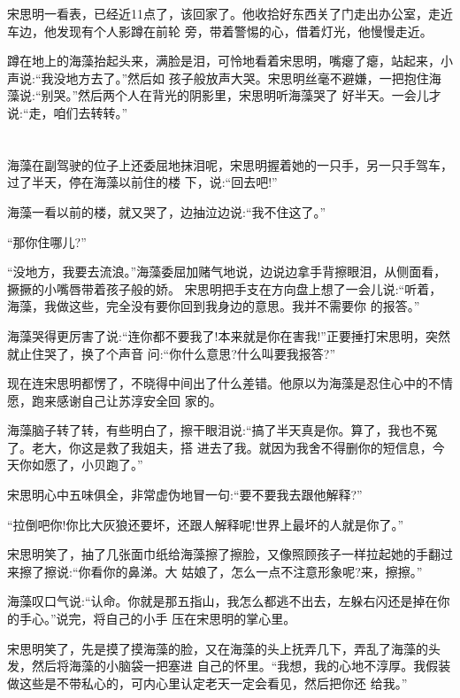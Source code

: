 \documentclass[11pt,a4paper,onecolumn]{article}
\begin{document}
宋思明一看表，已经近11点了，该回家了。他收拾好东西关了门走出办公室，走近车边，他发现有个人影蹲在前轮
旁，带着警惕的心，借着灯光，他慢慢走近。

蹲在地上的海藻抬起头来，满脸是泪，可怜地看着宋思明，嘴瘪了瘪，站起来，小声说:``我没地方去了。''然后如
孩子般放声大哭。宋思明丝毫不避嫌，一把抱住海藻说:``别哭。''然后两个人在背光的阴影里，宋思明听海藻哭了
好半天。一会儿才说:``走，咱们去转转。''

\section[\thesection]{}

海藻在副驾驶的位子上还委屈地抹泪呢，宋思明握着她的一只手，另一只手驾车，过了半天，停在海藻以前住的楼
下，说:``回去吧!''

海藻一看以前的楼，就又哭了，边抽泣边说:``我不住这了。''

``那你住哪儿?''

``没地方，我要去流浪。''海藻委屈加赌气地说，边说边拿手背擦眼泪，从侧面看，撅撅的小嘴唇带着孩子般的娇。
宋思明把手支在方向盘上想了一会儿说:``听着，海藻，我做这些，完全没有要你回到我身边的意思。我并不需要你
的报答。''

海藻哭得更厉害了说:``连你都不要我了!本来就是你在害我!''正要捶打宋思明，突然就止住哭了，换了个声音
问:``你什么意思?什么叫要我报答?''

现在连宋思明都愣了，不晓得中间出了什么差错。他原以为海藻是忍住心中的不情愿，跑来感谢自己让苏淳安全回
家的。

海藻脑子转了转，有些明白了，擦干眼泪说:``搞了半天真是你。算了，我也不冤了。老大，你这是救了我姐夫，搭
进去了我。就因为我舍不得删你的短信息，今天你如愿了，小贝跑了。''

宋思明心中五味俱全，非常虚伪地冒一句:``要不要我去跟他解释?''

``拉倒吧你!你比大灰狼还要坏，还跟人解释呢!世界上最坏的人就是你了。''

宋思明笑了，抽了几张面巾纸给海藻擦了擦脸，又像照顾孩子一样拉起她的手翻过来擦了擦说:``你看你的鼻涕。大
姑娘了，怎么一点不注意形象呢?来，擦擦。''

海藻叹口气说:``认命。你就是那五指山，我怎么都逃不出去，左躲右闪还是掉在你的手心。''说完，将自己的小手
压在宋思明的掌心里。

宋思明笑了，先是摸了摸海藻的脸，又在海藻的头上抚弄几下，弄乱了海藻的头发，然后将海藻的小脑袋一把塞进
自己的怀里。``我想，我的心地不淳厚。我假装做这些是不带私心的，可内心里认定老天一定会看见，然后把你还
给我。''
\end{document}
